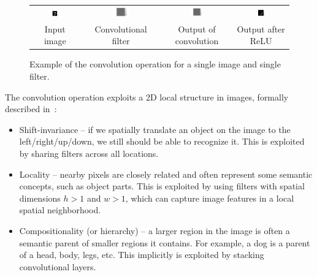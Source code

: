 \begin{figure}[htbp]
    \centering
    \footnotesize
    \begin{tabular}{cccc}
    \includegraphics[width=0.22\textwidth]{figs/mnist_digit.pdf} & 
    \includegraphics[width=0.22\textwidth]{figs/conv_kernel.pdf} & 
    \includegraphics[width=0.22\textwidth]{figs/conv_output.pdf} & 
    \includegraphics[width=0.22\textwidth]{figs/relu_output.pdf} \\
    Input image & Convolutional filter & Output of convolution & Output after ReLU \\
    \end{tabular}
    \caption{Example of the convolution operation for a single image and single filter.}
    \label{fig:conv}
\end{figure}

The convolution operation exploits a 2D local structure in images, formally described in~\citep{bronstein2017geometric}:
\vspace{-3pt}
\begin{itemize}
    \setlength{\itemsep}{1pt}
    \item Shift-invariance -- if we spatially translate an object on the image to the left/right/up/down, we still should be able to recognize it. This is exploited by sharing filters across all locations.
    \item Locality -- nearby pixels are closely related and often represent some semantic concepts, such as object parts. This is exploited by using filters with spatial dimensions $h > 1$ and $w > 1$, which can capture image features in a local spatial neighborhood.
    \item Compositionality (or hierarchy) -- a larger region in the image is often a semantic parent of smaller regions it contains. For example, a dog is a parent of a head, body, legs, etc. 
    This implicitly is exploited by stacking convolutional layers.
\end{itemize}

